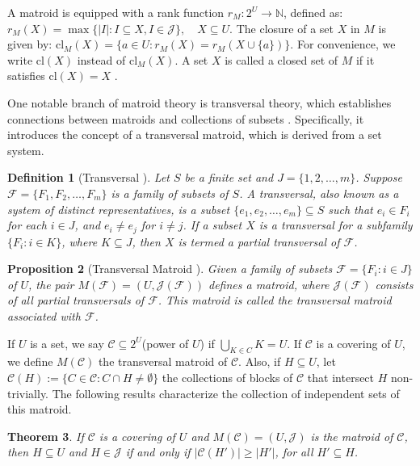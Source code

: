 \documentclass{article}
\newtheorem{theorem}{Theorem}[section]
\newtheorem{proposition}[theorem]{Proposition}
\newtheorem{definition}[theorem]{Definition}
\begin{document}
A matroid is equipped with a rank function \( r_M : 2^U \to \mathbb{N} \), defined as:
$
    r_M(X) = \max\{|I| : I \subseteq X, I \in \mathcal{J}\}, \quad X \subseteq U.
$
The closure of a set \( X \) in \( M \) is given by:
$
    \mathrm{cl}_M(X) = \{a \in U : r_M(X) = r_M(X \cup \{a\})\}.
$
For convenience, we write \( \mathrm{cl}(X) \) instead of \( \mathrm{cl}_M(X) \). A set \( X \) is called a closed set of $M$ if it satisfies \( \mathrm{cl}(X) = X \) \citep{Welsh1976}.

One notable branch of matroid theory is transversal theory, which establishes connections between matroids and collections of subsets \citep{Lovasz1978}. Specifically, it introduces the concept of a transversal matroid, which is derived from a set system.

\begin{definition}[Transversal \citep{Mirsky1971}]
Let \( S \) be a finite set and \( J = \{1, 2, \dots, m\} \). Suppose \( \mathcal{F} = \{F_1, F_2, \dots, F_m\} \) is a family of subsets of \( S \). A transversal, also known as a system of distinct representatives, is a subset \( \{e_1, e_2, \dots, e_m\} \subseteq S \) such that \( e_i \in F_i \) for each \( i \in J \), and $e_i \neq e_j$ for $i\neq j$. If a subset \( X \) is a transversal for a subfamily \( \{F_i : i \in K\} \), where \( K \subseteq J \), then \( X \) is termed a partial transversal of \( \mathcal{F} \).
\end{definition}


\begin{proposition}[Transversal Matroid \citep{Mirsky1971}]
Given a family of subsets \( \mathcal{F} = \{F_i : i \in J\} \) of \( U \), the pair \( M(\mathcal{F}) = (U, \mathcal{J}(\mathcal{F})) \) defines a matroid, where \( \mathcal{J}(\mathcal{F}) \) consists of all partial transversals of \( \mathcal{F} \). This matroid is called the transversal matroid associated with \( \mathcal{F} \).
\end{proposition}

If $U$ is a set, we say $\mathcal{C} \subseteq 2^{U}$(power of $U$) if $\bigcup_{K\in C}K=U$. If $\mathcal{C}$ is a covering of $U$, we define $M(\mathcal{C})$ the transversal matroid of $\mathcal{C}$. Also, if $H \subseteq U$, let $\mathcal{C}(H):=\{C\in \mathcal{C}: C\cap H\neq \emptyset\}$ the collections of blocks of $\mathcal{C}$ that intersect $H$ non-trivially.
The following results characterize the collection of independent sets of this matroid. 
\begin{theorem}\label{matching1}\citep{Mirsky1971}
    If $\mathcal{C}$ is a covering of $U$ and $M(\mathcal{C})=(U,\mathcal{J})$ is the matroid of $\mathcal{C}$, then $H\subseteq U$ and $H\in \mathcal{J}$ if and only if $|\mathcal{C}(H')|\geq |H'|$, for all $H'\subseteq H$.
\end{theorem}
\end{document}
